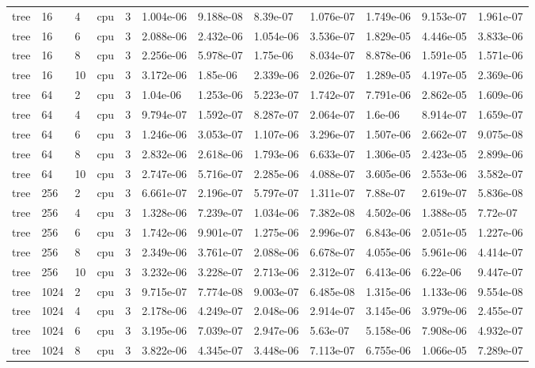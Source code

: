 \begin{tabular}{llllllllllll}
tree & 16 & 4 & cpu & 3 & 1.004e-06 & 9.188e-08 & 8.39e-07 & 1.076e-07 & 1.749e-06 & 9.153e-07 & 1.961e-07 \\
tree & 16 & 6 & cpu & 3 & 2.088e-06 & 2.432e-06 & 1.054e-06 & 3.536e-07 & 1.829e-05 & 4.446e-05 & 3.833e-06 \\
tree & 16 & 8 & cpu & 3 & 2.256e-06 & 5.978e-07 & 1.75e-06 & 8.034e-07 & 8.878e-06 & 1.591e-05 & 1.571e-06 \\
tree & 16 & 10 & cpu & 3 & 3.172e-06 & 1.85e-06 & 2.339e-06 & 2.026e-07 & 1.289e-05 & 4.197e-05 & 2.369e-06 \\
tree & 64 & 2 & cpu & 3 & 1.04e-06 & 1.253e-06 & 5.223e-07 & 1.742e-07 & 7.791e-06 & 2.862e-05 & 1.609e-06 \\
tree & 64 & 4 & cpu & 3 & 9.794e-07 & 1.592e-07 & 8.287e-07 & 2.064e-07 & 1.6e-06 & 8.914e-07 & 1.659e-07 \\
tree & 64 & 6 & cpu & 3 & 1.246e-06 & 3.053e-07 & 1.107e-06 & 3.296e-07 & 1.507e-06 & 2.662e-07 & 9.075e-08 \\
tree & 64 & 8 & cpu & 3 & 2.832e-06 & 2.618e-06 & 1.793e-06 & 6.633e-07 & 1.306e-05 & 2.423e-05 & 2.899e-06 \\
tree & 64 & 10 & cpu & 3 & 2.747e-06 & 5.716e-07 & 2.285e-06 & 4.088e-07 & 3.605e-06 & 2.553e-06 & 3.582e-07 \\
tree & 256 & 2 & cpu & 3 & 6.661e-07 & 2.196e-07 & 5.797e-07 & 1.311e-07 & 7.88e-07 & 2.619e-07 & 5.836e-08 \\
tree & 256 & 4 & cpu & 3 & 1.328e-06 & 7.239e-07 & 1.034e-06 & 7.382e-08 & 4.502e-06 & 1.388e-05 & 7.72e-07 \\
tree & 256 & 6 & cpu & 3 & 1.742e-06 & 9.901e-07 & 1.275e-06 & 2.996e-07 & 6.843e-06 & 2.051e-05 & 1.227e-06 \\
tree & 256 & 8 & cpu & 3 & 2.349e-06 & 3.761e-07 & 2.088e-06 & 6.678e-07 & 4.055e-06 & 5.961e-06 & 4.414e-07 \\
tree & 256 & 10 & cpu & 3 & 3.232e-06 & 3.228e-07 & 2.713e-06 & 2.312e-07 & 6.413e-06 & 6.22e-06 & 9.447e-07 \\
tree & 1024 & 2 & cpu & 3 & 9.715e-07 & 7.774e-08 & 9.003e-07 & 6.485e-08 & 1.315e-06 & 1.133e-06 & 9.554e-08 \\
tree & 1024 & 4 & cpu & 3 & 2.178e-06 & 4.249e-07 & 2.048e-06 & 2.914e-07 & 3.145e-06 & 3.979e-06 & 2.455e-07 \\
tree & 1024 & 6 & cpu & 3 & 3.195e-06 & 7.039e-07 & 2.947e-06 & 5.63e-07 & 5.158e-06 & 7.908e-06 & 4.932e-07 \\
tree & 1024 & 8 & cpu & 3 & 3.822e-06 & 4.345e-07 & 3.448e-06 & 7.113e-07 & 6.755e-06 & 1.066e-05 & 7.289e-07 \\

\end{tabular}
